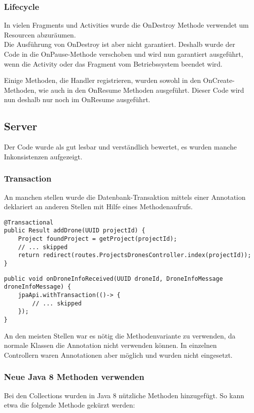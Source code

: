 \subsubsection{Lifecycle}

In vielen Fragments und Activities wurde die OnDestroy Methode verwendet um Resourcen abzuräumen.\\
Die Ausführung von OnDestroy ist aber nicht garantiert.
Deshalb wurde der Code in die OnPause-Methode verschoben und wird nun garantiert ausgeführt, wenn die Activity oder das Fragment vom Betriebssystem beendet wird.

Einige Methoden, die Handler registrieren, wurden sowohl in den OnCreate-Methoden, wie auch in den OnResume Methoden ausgeführt. Dieser Code wird nun deshalb nur noch im OnResume ausgeführt.

\subsection{Server}

Der Code wurde als gut lesbar und verständlich bewertet, es wurden manche Inkonsistenzen aufgezeigt.

\subsubsection{Transaction}
An manchen stellen wurde die Datenbank-Transaktion mittels einer Annotation deklariert an anderen Stellen mit Hilfe eines Methodenaufrufs. 
\begin{lstlisting}
@Transactional
public Result addDrone(UUID projectId) {
    Project foundProject = getProject(projectId);
    // ... skipped
    return redirect(routes.ProjectsDronesController.index(projectId));
}
\end{lstlisting}

\begin{lstlisting}
public void onDroneInfoReceived(UUID droneId, DroneInfoMessage droneInfoMessage) {
    jpaApi.withTransaction(()-> {
        // ... skipped
    });
}
\end{lstlisting}

An den meisten Stellen war es nötig die Methodenvariante zu verwenden, da normale Klassen die Annotation nicht verwenden können. In einzelnen Controllern waren Annotationen aber möglich und wurden nicht eingesetzt.

\subsubsection{Neue Java 8 Methoden verwenden}
Bei den Collections wurden in Java 8 nützliche Methoden hinzugefügt. So kann etwa die folgende Methode gekürzt werden:


